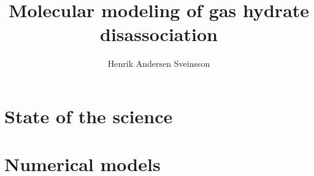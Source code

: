 \documentclass[twoside, english, a4paper]{uiofysmaster}
\title{Molecular modeling of gas hydrate disassociation}
\author{Henrik Andersen Sveinsson}
\begin{document}
\maketitle



\tableofcontents



\part{State of the science}


\part{Numerical models}


\part{}


\end{document}
